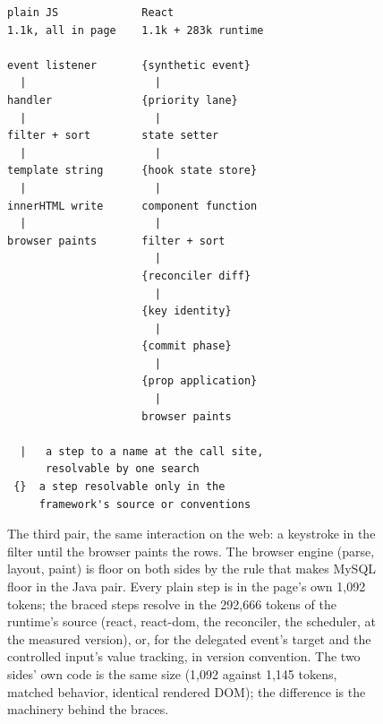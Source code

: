 \begin{figure}[H]
\footnotesize
\begin{verbatim}
plain JS             React
1.1k, all in page    1.1k + 283k runtime

event listener       {synthetic event}
  |                    |
handler              {priority lane}
  |                    |
filter + sort        state setter
  |                    |
template string      {hook state store}
  |                    |
innerHTML write      component function
  |                    |
browser paints       filter + sort
                       |
                     {reconciler diff}
                       |
                     {key identity}
                       |
                     {commit phase}
                       |
                     {prop application}
                       |
                     browser paints

  |   a step to a name at the call site,
      resolvable by one search
 {}  a step resolvable only in the
     framework's source or conventions
\end{verbatim}
\caption{The third pair, the same interaction on the web: a keystroke in
the filter until the browser paints the rows. The browser engine (parse,
layout, paint) is floor on both sides by the rule that makes MySQL floor
in the Java pair. Every plain step is in the page's own 1,092 tokens; the
braced steps resolve in the 292,666 tokens of the runtime's source
(react, react-dom, the reconciler, the scheduler, at the measured
version), or, for the delegated event's target and the controlled
input's value tracking, in version convention. The two sides' own code
is the same size (1,092 against 1,145 tokens, matched behavior,
identical rendered DOM); the difference is the machinery behind the
braces.}
\label{fig:webpaths}
\end{figure}
